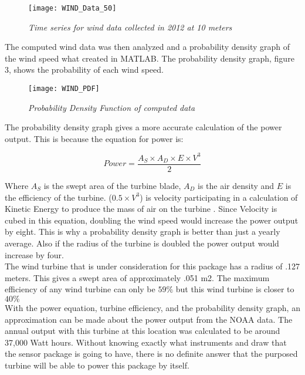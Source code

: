 \begin{figure}[H]
\centering
\texttt{[image: WIND\_Data\_50]}
\caption{\textit{Time series for wind data collected in 2012 at 10 meters}}
\label{fig:WIND_50}
\end{figure}

\indent The computed wind data was then analyzed and a probability density graph of the wind speed what created in MATLAB. The probability density graph, figure 3, shows the probability of each wind speed.

\begin{figure}[H]
\centering
\texttt{[image: WIND\_PDF]}
\caption{\textit{Probability Density Function of computed data}}
\label{fig:WIND_PDF}
\end{figure}

\indent The probability density graph gives a more accurate calculation of the power output. This is because the equation for power is:

\begin{equation}
Power = \frac{A_{S} \times A_{D} \times E \times V^{3}}{2}
\end{equation}

\indent Where $A_{S}$ is the swept area of the turbine blade, $A_{D}$ is the air density and $E$ is the efficiency of the turbine. ($0.5 \times V^{3}$) is velocity participating in a calculation of Kinetic Energy to produce the mass of air on the turbine \cite{arcGIS:2013}. Since Velocity is cubed in this equation, doubling the wind speed would increase the power output by eight. This is why a probability density graph is better than just a yearly average. Also if the radius of the turbine is doubled the power output would increase by four. \\
\indent The wind turbine that is under consideration for this package has a radius of .127 meters. This gives a swept area of approximately .051 m2. The maximum efficiency of any wind turbine can only be $59\%$ but this wind turbine is closer to $40\%$ \cite{Windpower}\\
\indent With the power equation, turbine efficiency, and the probability density graph, an approximation can be made about the power output from the NOAA data. The annual output with this turbine at this location was calculated to be around 37,000 Watt hours. Without knowing exactly what instruments and draw that the sensor package is going to have, there is no definite answer that the purposed turbine will be able to power this package by itself. 
